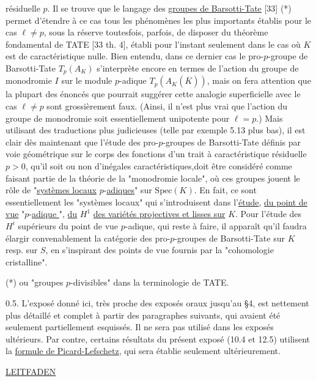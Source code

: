 résiduelle $p$. Il se trouve que le langage des \underline{groupes de Barsotti-Tate} [33] (*) permet d'étendre à ce cas tous les phénomènes les plus importants établis pour le cas $\ell \neq p$, sous la réserve toutesfois, parfois, de disposer du théorème fondamental de TATE [33 th. 4], établi pour l'instant seulement dans le cas où $K$ est de caractéristique nulle. Bien entendu, dans ce dernier cas le pro-$p$-groupe de Barsotti-Tate $T_p(A_K)$ s'interprète encore en termes de l'action du groupe de monodromie $I$ sur le module $p$-adique $T_p(A_K(\overline{K}))$, mais on fera attention que la plupart des énoncés que pourrait suggérer cette analogie superficielle avec le cas $\ell \neq p$ sont grossièrement faux. (Ainsi, il n'est plus vrai que l'action du groupe de monodromie soit essentiellement unipotente pour $\ell = p$.) Mais utilisant des traductions plus judicieuses (telle par exemple 5.13 plus bas), il est clair dès maintenant que l'étude des pro-$p$-groupes de Barsotti-Tate définis par voie géométrique sur le corps des fonctions d'un trait à caractéristique résiduelle $p > 0$, qu'il soit ou non d'inégales caractéristiques,doit être considéré comme faisant partie de la théorie de la "monodromie locale", où ces groupes jouent le rôle de "\underline{systèmes locaux} $p$-\underline{adiques}" sur $\mathrm{Spec}(K)$. En fait, ce sont essentiellement les "systèmes locaux" qui s'introduisent dans l'\underline{étude}, \underline{du point de vue} "$p$-\underline{adique }", \underline{du} $H^1$ \underline{des variétés projectives et lisses sur} $K$. Pour l'étude des $H^i$ supérieurs du point de vue $p$-adique, qui reste à faire, il apparaît qu'il faudra élargir convenablement la catégorie des pro-$p$-groupes de Barsotti-Tate sur $K$ resp. sur $S$, en s'inspirant des points de vue fournis par la "cohomologie cristalline".

(*) ou "groupes $p$-divisibles" dans la terminologie de TATE.



0.5. L'exposé donné ici, très proche des exposés oraux jusqu'au \S 4, est nettement plus détaillé et complet à partir des paragraphes suivants, qui avaient été seulement partiellement esquissés. Il ne sera pas utilisé dans les exposés ultérieurs. Par contre, certains résultats du présent exposé (10.4 et 12.5) utilisent la \underline{formule de Picard-Lefschetz}, qui sera établie seulement ultérieurement.


\underline{LEITFADEN}

